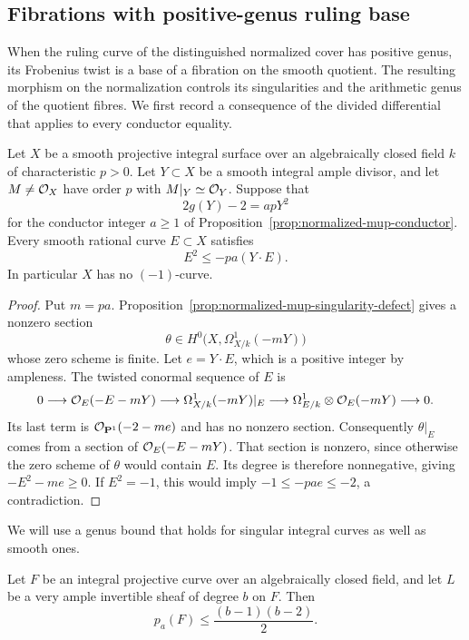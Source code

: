 \subsection{Fibrations with positive-genus ruling base}
\label{subsec:positive-genus-picard-fibration}

When the ruling curve of the distinguished normalized cover has positive
genus, its Frobenius twist is a base of a fibration on the smooth quotient.
The resulting morphism on the normalization controls its singularities
and the arithmetic genus of the quotient fibres. We first record a
consequence of the divided differential that applies to every conductor
equality.

\begin{proposition}\label{prop:equality-rational-curves}
Let $X$ be a smooth projective integral surface over an algebraically
closed field $k$ of characteristic $p>0$. Let $Y\subset X$ be a smooth
integral ample divisor, and let $M\ne\mathcal O_X$ have order $p$ with
$M|_Y\simeq\mathcal O_Y$. Suppose that
\[
 2g(Y)-2=apY^2
\]
for the conductor integer $a\geq1$ of
Proposition~\ref{prop:normalized-mup-conductor}.
Every smooth rational curve $E\subset X$ satisfies
\[
 E^2\leq-pa(Y\cdot E).
\]
In particular $X$ has no $(-1)$-curve.
\end{proposition}

\begin{proof}
Put $m=pa$. Proposition~\ref{prop:normalized-mup-singularity-defect}
gives a nonzero section
\[
 \theta\in H^0\bigl(X,\Omega^1_{X/k}(-mY)\bigr)
\]
whose zero scheme is finite. Let $e=Y\cdot E$, which is a positive
integer by ampleness. The twisted conormal sequence of $E$ is
\[
 0\longrightarrow\mathcal O_E(-E-mY)\longrightarrow
 \Omega^1_{X/k}(-mY)|_E\longrightarrow
 \Omega^1_{E/k}\otimes\mathcal O_E(-mY)\longrightarrow0.
\]
Its last term is $\mathcal O_{\mathbf P^1}(-2-me)$ and has no nonzero section.
Consequently $\theta|_E$ comes from a section of
$\mathcal O_E(-E-mY)$. That section is nonzero, since otherwise the zero
scheme of $\theta$ would contain $E$. Its degree is therefore
nonnegative, giving $-E^2-me\geq0$. If $E^2=-1$, this would imply
$-1\leq-pae\leq-2$, a contradiction.
\end{proof}

We will use a genus bound that holds for singular integral curves as
well as smooth ones.

\begin{lemma}\label{lem:very-ample-curve-genus-bound}
Let $F$ be an integral projective curve over an algebraically closed
field, and let $L$ be a very ample invertible sheaf of degree $b$ on $F$.
Then
\[
 p_a(F)\leq\frac{(b-1)(b-2)}2.
\]
\end{lemma}

